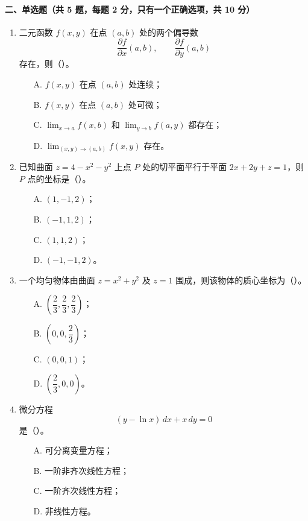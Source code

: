 \paragraph*{二、单选题（共 5 题，每题 2 分，只有一个正确选项，共 10 分）}
\begin{enumerate}
  \item 二元函数 $f(x,y)$ 在点 $(a,b)$ 处的两个偏导数
  \[
    \frac{\partial f}{\partial x}(a,b),\qquad
    \frac{\partial f}{\partial y}(a,b)
  \]
  存在，则（\quad）。
  \begin{enumerate}
    \item[A.] $f(x,y)$ 在点 $(a,b)$ 处连续；
    \item[B.] $f(x,y)$ 在点 $(a,b)$ 处可微；
    \item[C.] $\displaystyle \lim_{x\to a}f(x,b)$ 和 $\displaystyle \lim_{y\to b}f(a,y)$ 都存在；
    \item[D.] $\displaystyle \lim_{(x,y)\to(a,b)}f(x,y)$ 存在。
  \end{enumerate}

  \item 已知曲面 $z=4-x^2-y^2$ 上点 $P$ 处的切平面平行于平面 $2x+2y+z=1$，则 $P$ 点的坐标是（\quad）。
  \begin{enumerate}
    \item[A.] $(1,-1,2)$；
    \item[B.] $(-1,1,2)$；
    \item[C.] $(1,1,2)$；
    \item[D.] $(-1,-1,2)$。
  \end{enumerate}

  \item 一个均匀物体由曲面 $z=x^2+y^2$ 及 $z=1$ 围成，则该物体的质心坐标为（\quad）。
  \begin{enumerate}
    \item[A.] $\left(\dfrac23,\dfrac23,\dfrac23\right)$；
    \item[B.] $\left(0,0,\dfrac23\right)$；
    \item[C.] $(0,0,1)$；
    \item[D.] $\left(\dfrac23,0,0\right)$。
  \end{enumerate}

  \item 微分方程
  \[
    (y-\ln x)\,dx+x\,dy=0
  \]
  是（\quad）。
  \begin{enumerate}
    \item[A.] 可分离变量方程；
    \item[B.] 一阶非齐次线性方程；
    \item[C.] 一阶齐次线性方程；
    \item[D.] 非线性方程。
  \end{enumerate}


\end{enumerate}
